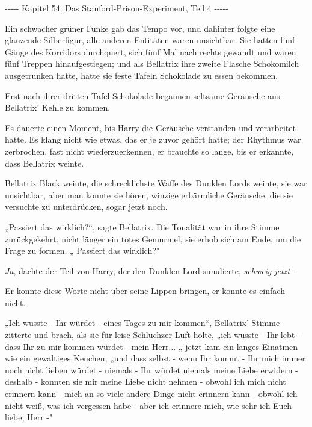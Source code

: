 

\hypertarget{das-stanford-prison-experiment-teil-4}{%

-\/-\/-\/-\/- Kapitel 54: Das Stanford-Prison-Experiment, Teil 4 -\/-\/-\/-\/-

Ein schwacher grüner Funke gab das Tempo vor, und dahinter folgte eine glänzende Silberfigur, alle anderen Entitäten waren unsichtbar. Sie hatten fünf Gänge des Korridors durchquert, sich fünf Mal nach rechts gewandt und waren fünf Treppen hinaufgestiegen; und als Bellatrix ihre zweite Flasche Schokomilch ausgetrunken hatte, hatte sie feste Tafeln Schokolade zu essen bekommen.

Erst nach ihrer dritten Tafel Schokolade begannen seltsame Geräusche aus Bellatrix' Kehle zu kommen.

Es dauerte einen Moment, bis Harry die Geräusche verstanden und verarbeitet hatte. Es klang nicht wie etwas, das er je zuvor gehört hatte; der Rhythmus war zerbrochen, fast nicht wiederzuerkennen, er brauchte so lange, bis er erkannte, dass Bellatrix weinte.

Bellatrix Black weinte, die schrecklichste Waffe des Dunklen Lords weinte, sie war unsichtbar, aber man konnte sie hören, winzige erbärmliche Geräusche, die sie versuchte zu unterdrücken, sogar jetzt noch.

„Passiert das wirklich?“, sagte Bellatrix. Die Tonalität war in ihre Stimme zurückgekehrt, nicht länger ein totes Gemurmel, sie erhob sich am Ende, um die Frage zu formen. „ Passiert das wirklich?"

\emph{Ja}, dachte der Teil von Harry, der den Dunklen Lord simulierte, \emph{schweig jetzt} -

Er konnte diese Worte nicht über seine Lippen bringen, er konnte es einfach nicht.

„Ich wusste - Ihr würdet - eines Tages zu mir kommen“, Bellatrix' Stimme zitterte und brach, als sie für leise Schluchzer Luft holte, „ich wusste - Ihr lebt - dass Ihr zu mir kommen würdet - mein Herr... „ jetzt kam ein langes Einatmen wie ein gewaltiges Keuchen, „und dass selbst - wenn Ihr kommt - Ihr mich immer noch nicht lieben würdet - niemals - Ihr würdet niemals meine Liebe erwidern - deshalb - konnten sie mir meine Liebe nicht nehmen - obwohl ich mich nicht erinnern kann - mich an so viele andere Dinge nicht erinnern kann - obwohl ich nicht weiß, was ich vergessen habe - aber ich erinnere mich, wie sehr ich Euch liebe, Herr -"

}
